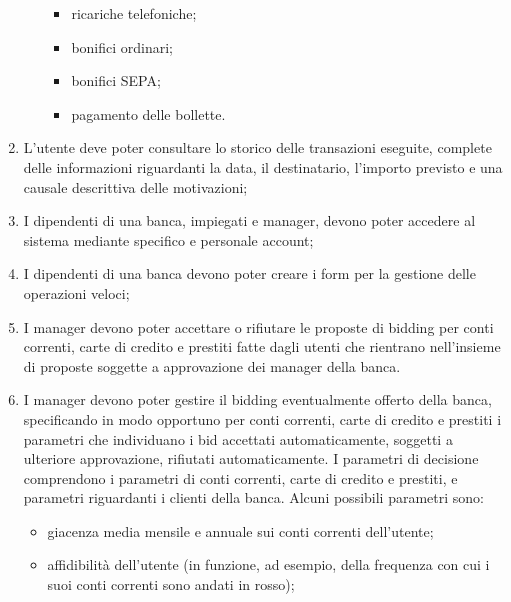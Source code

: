\begin{enumerate}
\begin{enumerate}
			\begin{itemize}
				\item ricariche telefoniche;
				\item bonifici ordinari;
				\item bonifici SEPA;
				\item pagamento delle bollette.
			\end{itemize}
	\end{enumerate}
	\item \label{itm:utente:funzionali:storico} L'utente deve poter consultare lo storico delle transazioni eseguite, complete delle informazioni riguardanti la data, il destinatario, l'importo previsto e una causale descrittiva delle motivazioni;
	\item \label{itm:utente:funzionali:dipendenti:accesso} I dipendenti di una banca, impiegati e manager, devono poter accedere al sistema mediante specifico e personale account;
	\item \label{itm:utente:funzionali:dipendenti:operazioni-veloci} I dipendenti di una banca devono poter creare i form per la gestione delle operazioni veloci;
	\item \label{itm:utente:funzionali:management:bidding:approvazione} I manager devono poter accettare o rifiutare le proposte di bidding per conti correnti, carte di credito e prestiti fatte dagli utenti che rientrano nell'insieme di proposte soggette a approvazione dei manager della banca.
	\item \label{itm:utente:funzionali:management:bidding:creazione} I manager devono poter gestire il bidding eventualmente offerto della banca, specificando in modo opportuno per conti correnti, carte di credito e prestiti i parametri che individuano i bid accettati automaticamente, soggetti a ulteriore approvazione, rifiutati automaticamente.
	I parametri di decisione comprendono i parametri di conti correnti, carte di credito e prestiti, e parametri riguardanti i clienti della banca.
	Alcuni possibili parametri sono:
		\begin{itemize}
			\item giacenza media mensile e annuale sui conti correnti dell'utente;
			\item affidibilit\`a dell'utente (in funzione, ad esempio, della frequenza con cui i suoi conti correnti sono andati in rosso);

\end{itemize}
\end{enumerate}
